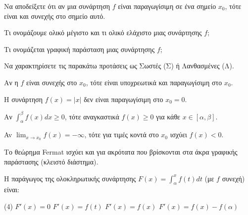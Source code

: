 \documentclass[11pt,a4paper]{article}
\newcommand{\kerkissans}[1]{{\fontfamily{maksf}\selectfont \textbf{#1}}}
\renewcommand{\textdexiakeraia}{}
\newcommand{\dint}{\displaystyle\int}
\newcommand\themanum{A}
\newcounter{thema}[section]
\renewcommand{\thethema}{\arabic{thema}}
\newcommand{\Thema}{\refstepcounter{thema}{\textbf{\textcolor{black}{\faPenSquare\ \  \large \kerkissans{\textbf{\thethemaο\hspace{2mm}Θέμα}}}}}\hspace{0mm}}{}
\newenvironment{thema}[1]
{\begin{tcolorbox}[title=\Thema\kerkissans{\textbf{\large{  #1}}},breakable,
enhanced standard,titlerule=0pt,toprule=0pt, rightrule=0pt, bottomrule=0pt,
colback=white,left=0mm,top=1mm,bottom=0mm,
boxrule=0pt,
colframe=white,leftrule=0mm,sharp corners,coltitle=black]
\renewcommand{\themanum}{#1}}
{\end{tcolorbox}}
\begin{document}
\setcounter{page}{1} %
\begin{thema}{A}
\begin{erwthma}
    \item Να αποδείξετε ότι αν μια συνάρτηση $f$ είναι παραγωγίσιμη σε ένα σημείο $x_0$, τότε είναι και συνεχής στο σημείο αυτό.
    \item Τι ονομάζουμε ολικό μέγιστο και τι ολικό ελάχιστο μιας συνάρτησης $f$;
    \item Τι ονομάζεται γραφική παράσταση μιας συνάρτησης $f$;
    \item Να χαρακτηρίσετε τις παρακάτω προτάσεις ως Σωστές (Σ) ή Λανθασμένες (Λ).
    \begin{alist}
        \item Αν η $f$ είναι συνεχής στο $x_0$, τότε είναι υποχρεωτικά και παραγωγίσιμη στο $x_0$.
        \item Η συνάρτηση $f(x) = |x|$ δεν είναι παραγωγίσιμη στο $x_0=0$.
        \item Αν $\int_\alpha^\beta f(x) dx \ge 0$, τότε αναγκαστικά $f(x) \ge 0$ για κάθε $x \in [\alpha, \beta]$.
        \item Av $\lim_{x\to x_0} f(x) = -\infty$, τότε για τιμές κοντά στο $x_0$ ισχύει $f(x)<0$.
        \item Το θεώρημα Fermat ισχύει και για ακρότατα που βρίσκονται στα άκρα γραφικής παράστασης (κλειστό διάστημα).
    \end{alist}
    \item Η παράγωγος της ολοκληρωτικής συνάρτησης $F(x) = \dint_\alpha^x f(t) dt$ (με $f$ συνεχή) είναι:
    \begin{tasks}[label=\let\textdexiakeraia\relax\alph*.](4)
        \task $F'(x) = 0$
        \task $F'(x) = f(t)$
        \task $F'(x) = f(x)$
        \task $F'(x) = f(x) - f(\alpha)$
    \end{tasks}
\end{erwthma}
\end{thema}
\vspace{1cm}
\end{document}
